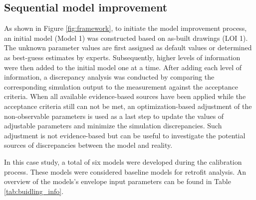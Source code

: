 \documentclass[3p,times,12pt]{elsarticle}
\begin{document}
\begin{sloppypar}
\subsection{Sequential model improvement}
\label{S:2.3}
As shown in Figure \ref{fig:framework}, to initiate the model improvement process, an initial model (Model 1) was constructed based on as-built drawings (LOI 1). The unknown parameter values are first assigned as default values or determined as best-guess estimates by experts. Subsequently, higher levels of information were then added to the initial model one at a time. After adding each level of information, a discrepancy analysis was conducted by comparing the corresponding simulation output to the measurement against the acceptance criteria. When all available evidence-based sources have been applied while the acceptance criteria still can not be met, an optimization-based adjustment of the non-observable parameters is used as a last step to update the values of adjustable parameters and minimize the simulation discrepancies. Such adjustment is not evidence-based but can be useful to investigate the potential sources of discrepancies between the model and reality.

In this case study, a total of six models were developed during the calibration process. These models were considered baseline models for retrofit analysis. An overview of the models's envelope input parameters can be found in Table \ref{tab:buidling_info}. 


\end{sloppypar}
\end{document}
